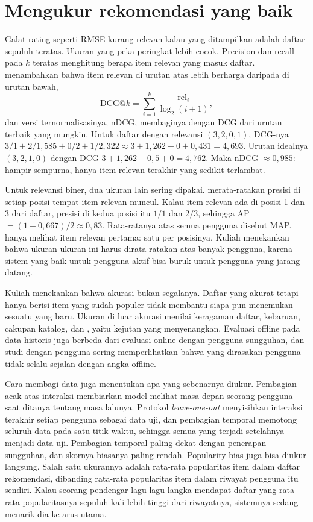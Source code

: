 \section{Mengukur rekomendasi yang baik}

Galat rating seperti RMSE kurang relevan kalau yang ditampilkan adalah daftar sepuluh teratas. Ukuran yang
peka peringkat lebih cocok. Precision dan recall pada $k$ teratas menghitung berapa item relevan yang
masuk daftar.  \citep{jarvelin2002} menambahkan bahwa item relevan di
urutan atas lebih berharga daripada di urutan bawah,
\begin{equation}
\mathrm{DCG}@k=\sum_{i=1}^k\frac{\mathrm{rel}_i}{\log_2(i+1)},
\end{equation}
dan versi ternormalisasinya, nDCG, membaginya dengan DCG dari urutan terbaik yang mungkin. Untuk daftar
dengan relevansi $(3,2,0,1)$, DCG-nya $3/1+2/1{,}585+0/2+1/2{,}322\approx3+1{,}262+0+0{,}431=4{,}693$. Urutan
idealnya $(3,2,1,0)$ dengan DCG $3+1{,}262+0{,}5+0=4{,}762$. Maka nDCG $\approx0{,}985$: hampir sempurna,
hanya item relevan terakhir yang sedikit terlambat.

Untuk relevansi biner, dua ukuran lain sering dipakai.  merata-ratakan presisi di setiap posisi
tempat item relevan muncul. Kalau item relevan ada di posisi 1 dan 3 dari daftar, presisi di kedua posisi itu $1/1$ dan
$2/3$, sehingga AP $=(1+0{,}667)/2\approx0{,}83$. Rata-ratanya atas semua pengguna disebut MAP. 
hanya melihat item relevan pertama: satu per posisinya. Kuliah menekankan bahwa ukuran-ukuran ini harus dirata-ratakan
atas banyak pengguna, karena sistem yang baik untuk pengguna aktif bisa buruk untuk pengguna yang jarang
datang.

Kuliah menekankan bahwa akurasi bukan segalanya. Daftar yang akurat tetapi hanya berisi item yang sudah
populer tidak membantu siapa pun menemukan sesuatu yang baru. Ukuran di luar akurasi menilai keragaman
daftar, kebaruan, cakupan katalog, dan , yaitu kejutan yang menyenangkan. Evaluasi
offline pada data historis juga berbeda dari evaluasi online dengan pengguna sungguhan, dan studi dengan
pengguna sering memperlihatkan bahwa yang dirasakan pengguna tidak selalu sejalan dengan angka offline.

Cara membagi data juga menentukan apa yang sebenarnya diukur. Pembagian acak atas interaksi membiarkan model melihat
masa depan seorang pengguna saat ditanya tentang masa lalunya. Protokol \emph{leave-one-out} menyisihkan interaksi terakhir
setiap pengguna sebagai data uji, dan pembagian temporal memotong seluruh data pada satu titik waktu, sehingga semua
yang terjadi setelahnya menjadi data uji. Pembagian temporal paling dekat dengan penerapan sungguhan, dan skornya
biasanya paling rendah. Popularity bias juga bisa diukur langsung. Salah satu ukurannya adalah rata-rata popularitas item
dalam daftar rekomendasi, dibanding rata-rata popularitas item dalam riwayat pengguna itu sendiri. Kalau seorang pendengar
lagu-lagu langka mendapat daftar yang rata-rata popularitasnya sepuluh kali lebih tinggi dari riwayatnya, sistemnya sedang
menarik dia ke arus utama.

